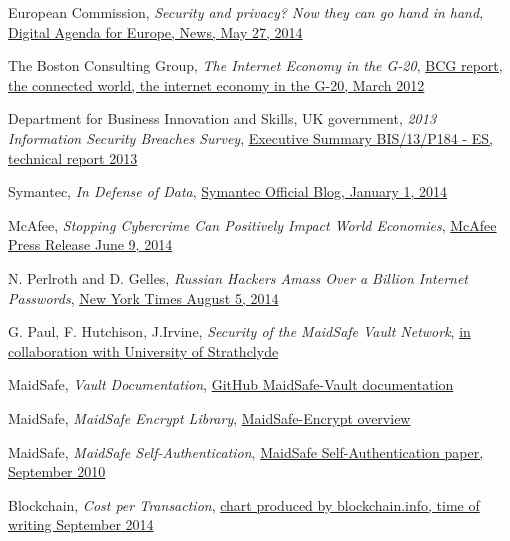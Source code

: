 \documentclass[twocolumn,english]{article}
\begin{document}
\begin{thebibliography}{9}
 European Commission, \emph{Security and privacy? Now they can go hand in hand}, \href{https://ec.europa.eu/digital-agenda/en/news/security-and-privacy-now-they-can-go-hand-hand}{Digital Agenda for Europe, News, May 27, 2014}

 The Boston Consulting Group, \emph{The Internet Economy in the G-20}, \href{https://www.bcg.com/documents/file100409.pdf}{BCG report, the connected world, the internet economy in the G-20, March 2012}

 Department for Business Innovation and Skills, UK government, \emph{2013 Information Security Breaches Survey}, \href{https://www.gov.uk/government/uploads/system/uploads/attachment_data/file/191671/bis-13-p184es-2013-information-security-breaches-survey-executive-summary.pdf}{Executive Summary BIS/13/P184 - ES, technical report 2013}

 Symantec, \emph{In Defense of Data}, \href{http://www.symantec.com/connect/blogs/data-breach-trends}{Symantec Official Blog, January 1, 2014}

 McAfee, \emph{Stopping Cybercrime Can Positively Impact World Economies}, \href{http://www.mcafee.com/uk/about/news/2014/q2/20140609-01.aspx}{McAfee Press Release June 9, 2014}

 N. Perlroth and D. Gelles, \emph{Russian Hackers Amass Over a Billion Internet Passwords}, \href{http://www.nytimes.com/2014/08/06/technology/russian-gang-said-to-amass-more-than-a-billion-stolen-internet-credentials.html}{New York Times August 5, 2014}

 G. Paul, F. Hutchison, J.Irvine, \emph{Security of the MaidSafe Vault Network}, \href{https://pure.strath.ac.uk/portal/files/34898763/Paul_etal_wwrf32_vault_network.pdf}{in collaboration with University of Strathclyde}

 MaidSafe, \emph{Vault Documentation}, \href{https://github.com/maidsafe/MaidSafe-Vault/wiki/Documentation}{GitHub MaidSafe-Vault documentation}

 MaidSafe, \emph{MaidSafe Encrypt Library}, \href{http://maidsafe.net/libraries-encrypt}{MaidSafe-Encrypt overview}

 MaidSafe, \emph{MaidSafe Self-Authentication}, \href{http://maidsafe.net/Whitepapers/pdf/SelfAuthentication.pdf}{MaidSafe Self-Authentication paper, September 2010}

 Blockchain, \emph{Cost per Transaction}, \href{https://blockchain.info/charts/cost-per-transaction}{chart produced by blockchain.info, time of writing September 2014}

\end{thebibliography}
\end{document}
